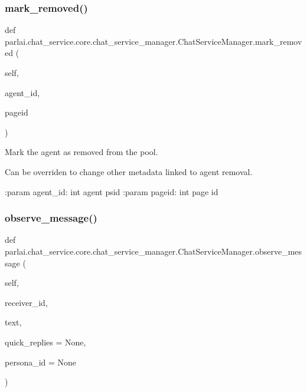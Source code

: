 \subsubsection{\texorpdfstring{mark\+\_\+removed()}{mark\_removed()}}
{\footnotesize\ttfamily def parlai.\+chat\+\_\+service.\+core.\+chat\+\_\+service\+\_\+manager.\+Chat\+Service\+Manager.\+mark\+\_\+removed (\begin{DoxyParamCaption}\item[{}]{self,  }\item[{}]{agent\+\_\+id,  }\item[{}]{pageid }\end{DoxyParamCaption})}

\begin{DoxyVerb}Mark the agent as removed from the pool.

Can be overriden to change other metadata linked to agent removal.

:param agent_id:
    int agent psid
:param pageid:
    int page id
\end{DoxyVerb}
 \mbox{\label{classparlai_1_1chat__service_1_1core_1_1chat__service__manager_1_1ChatServiceManager_a9e1d99a460b0e21ec47e9a3ae09d73a0}} 
\subsubsection{\texorpdfstring{observe\+\_\+message()}{observe\_message()}}
{\footnotesize\ttfamily def parlai.\+chat\+\_\+service.\+core.\+chat\+\_\+service\+\_\+manager.\+Chat\+Service\+Manager.\+observe\+\_\+message (\begin{DoxyParamCaption}\item[{}]{self,  }\item[{}]{receiver\+\_\+id,  }\item[{}]{text,  }\item[{}]{quick\+\_\+replies = {\ttfamily None},  }\item[{}]{persona\+\_\+id = {\ttfamily None} }\end{DoxyParamCaption})}

